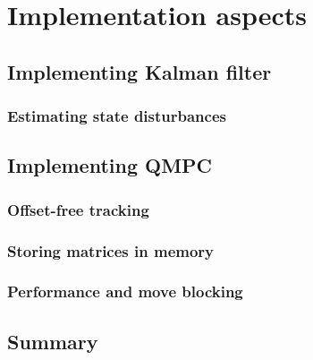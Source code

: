 \section{Implementation aspects}
\label{cap:Implementation}

\subsection{Implementing Kalman filter}

\subsubsection{Estimating state disturbances}

\subsection{Implementing QMPC}

\subsubsection{Offset-free tracking}

\subsubsection{Storing matrices in memory}

\subsubsection{Performance and move blocking}
\label{cap:implementation_performance}

\subsection{Summary}